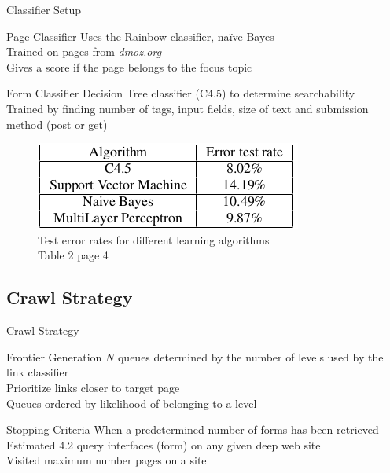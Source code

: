 \documentclass{beamer}
\begin{document}
\begin{frame}{Classifier Setup}
\begin{block}{Page Classifier}
Uses the Rainbow classifier, na{\"i}ve Bayes \\
Trained on pages from \emph{dmoz.org} \\
Gives a score if the page belongs to the focus topic \\
\end{block}
\begin{block}{Form Classifier}
Decision Tree classifier (C4.5) to determine searchability \\
Trained by finding number of tags, input fields, size of text and submission method (post or get) 
\end{block}
\begin{figure}
			\includegraphics[scale=0.4]{cer.png}
			\caption{\footnotesize{Test error rates for different learning algorithms} \\ Table 2 page 4}
		\end{figure}
\end{frame}
\subsection{Crawl Strategy}
\begin{frame}{Crawl Strategy}
\begin{block}{Frontier Generation}
$N$ queues determined by the number of levels used by the link classifier \\
Prioritize links closer to target page \\
Queues ordered by likelihood of belonging to a level \\
\end{block}
\begin{block}{Stopping Criteria}
When a predetermined number of forms  has been retrieved \\
Estimated 4.2 query interfaces (form) on any given deep web site \\
Visited maximum number pages on a site \\ 
\end{block}
\end{frame}
\end{document}

